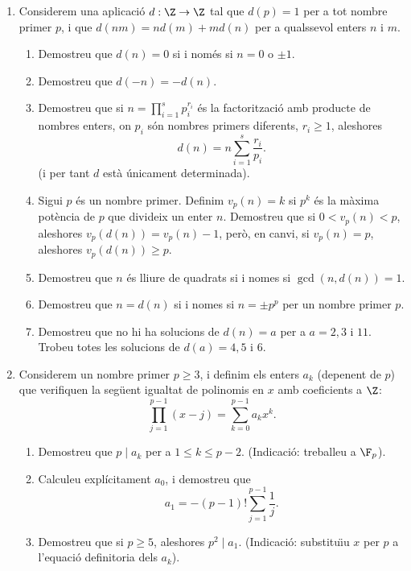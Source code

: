\begin{enumerate}[leftmargin=*]
\item Considerem una aplicació $d:\Z\to \Z$ tal que $d(p)=1$
per a tot nombre primer $p$, i que $d(n m)=nd(m)+md(n)$ per a qualssevol enters $n$ i $m$.

\begin{enumerate}
\item Demostreu que $d(n)=0$ si i només si $n=0$ o $\pm1$.

\item Demostreu que $d(-n)=-d(n)$.

\item Demostreu que si $n=\prod_{i=1}^s p_i^{r_i}$ és la
factorització amb producte de nombres enters, on $p_i$ són nombres
primers diferents, $r_i\ge 1$, aleshores
$$d(n)=n\sum_{i=1}^s \frac{r_i}{p_i}.$$
(i per tant $d$ està únicament determinada).

\item Sigui $p$ és un nombre primer. Definim $v_p(n)=k$ si
$p^k$ és la màxima pot\`{e}ncia de $p$ que divideix un enter
$n$. Demostreu que si $0<v_p(n)<p$, aleshores $v_p(d(n))=v_p(n)-1$,
però, en canvi, si $v_p(n)=p$, aleshores $v_p(d(n))\ge p$.

\item Demostreu que $n$ és lliure de quadrats si i nomes si
$\gcd(n,d(n))=1$.

\item Demostreu que $n=d(n)$ si i nomes si $n=\pm p^p$ per un
nombre primer $p$.

\item Demostreu que no hi ha solucions de $d(n)=a$ per a
$a=2,3$ i $11$. Trobeu totes les solucions de $d(a)=4,5$ i $6$.
\end{enumerate}

\item Considerem un nombre primer $p\ge 3$, i definim els
enters $a_k$ (depenent de $p$) que verifiquen la seg\"{u}ent igualtat de
polinomis en $x$ amb coeficients a $\Z$:
$$\prod_{j=1}^{p-1} (x-j) = \sum_{k=0}^{p-1} a_k x^k.$$

\begin{enumerate}
\item Demostreu que $p \mid a_k$ per a $1\le k\le
p-2$. (Indicació: treballeu a $\F_p$).

\item Calculeu explícitament $a_0$, i demostreu que
$$a_1=-(p-1)!\sum_{j=1}^{p-1}\frac 1j.$$

\item Demostreu que si $p\ge 5$, aleshores $p^2\mid
a_1$. (Indicació: substitu\"{\i}u $x$ per $p$ a l'equació definitoria dels
$a_k$).


\end{enumerate}
\end{enumerate}

